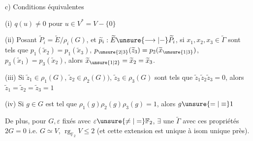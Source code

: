 
c) Conditions équivalentes

(i)  $q(u)\ne0$ pour  $u\in V^*=V-\{0\}$

(ii) Posant $\widetilde P_i=\widetilde E/\rho_i(G)$,  et $\widetilde p_i:\widetilde E\unsure{\longrightarrow|\mathbin{-}}\widetilde P_i$, si $x_1,x_2,x_3\in\widetilde\Gamma$ sont tels que $p_1(\widetilde x_2)=p_1(\widetilde x_3)$, $p_{\unsure{2|3}}(\widetilde z_3)=p_2(\widetilde x_{\unsure{1|3}})$, $p_3(\widetilde x_1)=p_3(\widetilde x_2)$, alors $\widetilde x_{\unsure{1|2}}=\widetilde x_2=\widetilde x_3$.

(iii) Si $\widetilde z_1\in\rho_1(G)$, $\widetilde z_2\in\rho_2(G))$, $\widetilde z_3\in\rho_3(G)$ sont tels que $\widetilde z_1\widetilde z_2\widetilde z_3=0$, alors $\widetilde z_1=\widetilde z_2=\widetilde z_3=1$

(iv) Si $g\in G$ est tel que $\rho_1(g)\rho_2(g)\rho_3(g)=1$, alors $g\unsure{=|\equiv}1$

De plus, pour $G,\varepsilon$ fixés avec $\varepsilon\unsure{\ne|=}\mathbb F_2$, $\exists$ une $\widetilde\Gamma$  avec ces propriétés  $2G=0$ i.e. $G\simeq V$, $\operatorname{rg}_{\mathbb F_2}V\leq2$ (et cette extension est unique à isom unique près).
